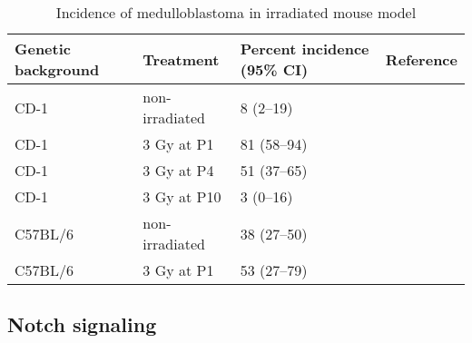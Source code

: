 



\begin{table}[h]
	\caption[Incidence of medulloblastoma in irradiated \high{+/-} mouse model]
	{
		Incidence of medulloblastoma in irradiated \high{+/-} mouse model
	}
	\label{tab:ptch1-mmu-mb}
	\footnotesize
	\setlength{\extrarowheight}{0.5em}
	\centering
	\begin{tabular}{l | l | l | l}
		\hline
		\textbf{Genetic background} & \textbf{Treatment} & \textbf{Percent incidence} (95\% CI) & \textbf{Reference} \\
		\hline
		CD-1 & non-irradiated & 8 (2--19) & \citeplainref{pazzaglia09} \\ 
		CD-1 & 3 Gy at P1 & 81 (58--94) & \citeplainref{pazzaglia06} \\
		CD-1 & 3 Gy at P4 & 51 (37--65) & \citeplainref{pazzaglia02} \\
		CD-1 & 3 Gy at P10 & 3 (0--16) & \citeplainref{pazzaglia06} \\
		C57BL/6 & non-irradiated & 38 (27--50) & \citeplainref{svard09, pazzaglia09} \\
		C57BL/6 & 3 Gy at P1 & 53 (27--79) & \citeplainref{pazzaglia09} \\
		\hline
	\end{tabular}
\end{table}


\subsection{Notch signaling}

